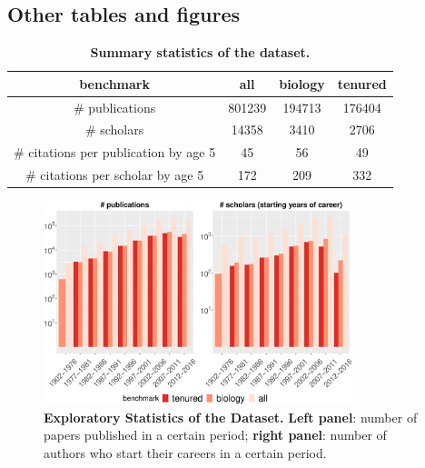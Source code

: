 \begin{refsection}
\section{Other tables and figures}
\begin{table}[ht]
\centering
\begin{tabular}{c|c|c|c}
 benchmark     & all   & biology & tenured \\
\midrule
\# publications & 801239 & 194713 & 176404 \\
\# scholars & 14358 & 3410  & 2706 \\
\# citations per publication by age 5  & 45    & 56    & 49 \\
\# citations per scholar by age 5 & 172   & 209   & 332 \\
\end{tabular}%
\caption{{\bf Summary statistics of the dataset. }}
\label{tab:exploratory}
\end{table}

\begin{figure}[ht!]
    \centering
    \includegraphics[width=0.8\textwidth]{figures/exploratory/npub_naut.eps}
    \caption{{\bf Exploratory Statistics of the Dataset.}
    \textbf{Left panel}: number of papers published in a certain period; \textbf{right panel}: number of authors who start their careers in a certain period. }
    \label{fig:exploratory}
\end{figure}


\end{refsection}
